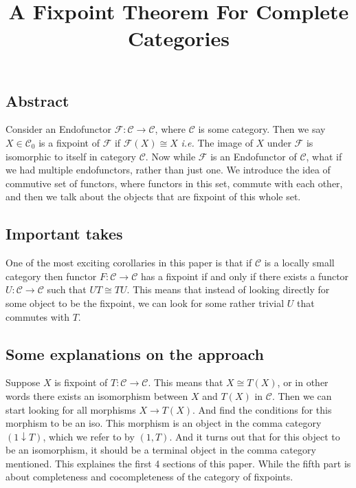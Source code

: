 \documentclass[12pt]{article}
\title{A Fixpoint Theorem For Complete Categories}
\newcounter{the}
\begin{document}
\maketitle
\subsection*{Abstract} 
Consider an Endofunctor $\mathscr F: \mathscr C \to \mathscr C$, where $\mathscr C$ is some category. Then we say $X \in \mathscr C_0$ is a fixpoint of $\mathscr F$ if $\mathscr F (X) \cong X$ \textit{i.e.} The image of $ X$ under $\mathscr F$ is isomorphic to itself in category $\mathscr C$. Now while $\mathscr F$ is an Endofunctor of $\mathscr C$, what if we had multiple endofunctors, rather than just one. We introduce the idea of commutive set of functors, where functors in this set, commute with each other, and then we talk about the objects that are fixpoint of this whole set. 


\subsection*{Important takes}
One of the most exciting corollaries in this paper is that if $\mathscr C$ is a locally small category then functor $F: \mathscr C \to \mathscr C$ has a fixpoint if and only if there exists a functor $U: \mathscr C \to \mathscr C$ such that $UT \cong TU$. This means that instead of looking directly for some object to be the fixpoint, we can look for some rather trivial $U$ that commutes with $T$. 

\subsection*{Some explanations on the approach}
Suppose $X$ is fixpoint of $T: \mathscr C \to \mathscr C$. This means that $X \cong T(X)$, or in other words there exists an isomorphism between $X$ and $T(X)$ in $\mathscr C$. Then we can start looking for all morphisms $X \to T(X)$. And find the conditions for this morphism to be an iso. This morphism is an object in the comma category $(1 \downarrow T)$, which we refer to by $(1, T)$. And it turns out that for this object to be an isomorphism, it should be a terminal object in the comma category mentioned. This explaines the first 4 sections of this paper. While the fifth part is about completeness and cocompleteness of the category of fixpoints.
\end{document}
